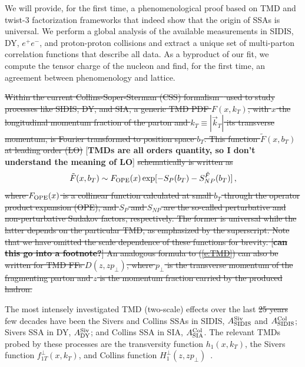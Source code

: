 \documentclass[twocolumn,prl,aps,superscriptaddress
               ,footinbib,amsfonts,amsmath,amssymb,showpacs]{revtex4-1}
\newcommand{\green}[1]{{\color{PineGreen} {#1}}}
\newcommand{\com}[1]{{\color{red} [\textbf{#1}]}}
\newcommand{\old}[1]{{\color{red}\sout{#1}}}
\newcommand{\new}[1]{{\color{blue}#1}}
\begin{document}
We will provide, for the first time, a phenomenological
proof based on TMD and twist-3 factorization frameworks that indeed
show that 
the origin of SSAs is universal. We perform a global analysis of the
available measurements in SIDIS, DY, $e^+e^-$, and proton-proton
collisions and extract a unique set of multi-parton correlation
functions that describe all data. As a byproduct of our fit, we
compute the tensor charge of the nucleon and find, for the first time,
an agreement between phenomenology and lattice.




\vspace{0.1cm}
%  

\old{Within the current Collins-Soper-Sterman (CSS)
formalism~\cite{Collins:2011zzd} used to study processes like SIDIS,
DY, and SIA, a generic TMD PDF $F(x,k_T)$, with $x$ the longitudinal
momentum fraction of the parton and $k_T\equiv |\vec{k}_T|$ its
transverse momentum, is Fourier transformed to position space $b_T$.
%
This function $\tilde{F}(x,b_T)$ at leading order (LO)}
\com{TMDs are all orders quantity, so I don't understand the meaning of LO}
\old{schematically is written as}~\cite{Collins:2011zzd, Collins:2014jpa,Aybat:2011ge, Bacchetta:2013pqa, Echevarria:2014xaa, Kang:2015msa}
\begin{equation}
\tilde{F}(x,b_T) \sim F_{\rm OPE}(x)\exp[-S_P(b_T)-S^{\tilde{F}}_{NP}(b_T)]\,, 
\label{e:TMD}
\end{equation}
%
\old{where $F_{\rm OPE}(x)$ is a collinear function calculated at small $b_T$
through the operator product expansion (OPE), and $S_P$ and $S_{NP}$
are the so-called perturbative and non-perturbative Sudakov factors,
respectively.
%
The former is universal while the latter depends on the particular
TMD, as emphasized by the superscript.  
%
\green{Note that we have omitted the scale dependence of these functions for
brevity.} \com{can this go into a footnote?} 
%
An analogous formula to (\ref{e:TMD}) can also be written for TMD FFs
$D(z,zp_\perp)$, where $p_\perp$ is the transverse momentum of the
fragmenting parton and $z$ is the momentum fraction carried by the
produced hadron.
}

The most intensely investigated TMD (two-scale) effects over the last
\old{25 years} \new{few decades} have been the Sivers and Collins SSAs in SIDIS, 
$A_{\rm SIDIS}^{\rm Siv}$ 
and 
$A_{\rm SIDIS}^{\rm Col}$; 
Sivers SSA in DY,
$A_{\rm DY}^{\rm Siv}$; 
and Collins SSA in SIA, 
$A_{\rm SIA}^{\rm Col}$.  
The relevant TMDs probed by these processes are the
transversity function $h_1(x,k_T)$, the Sivers function
$f_{1T}^\perp(x,k_T)$, and Collins function
$H_{1}^\perp(z,zp_\perp)$~\cite{Mulders:1995dh, Boer:1997mf,Bacchetta:2006tn, Arnold:2008kf, Pitonyak:2013dsu}.
\end{document}
